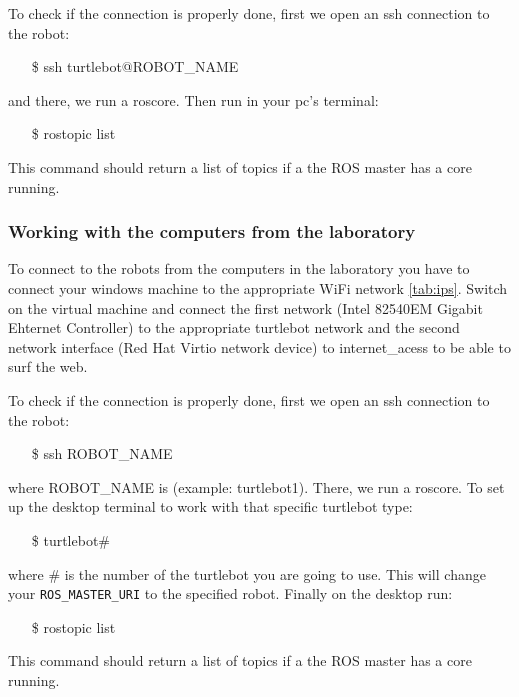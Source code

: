 \documentclass[a4paper,10pt]{article}
\begin{document}
To check if the connection is properly done, first we open an ssh connection to the robot:
\begin{shaded}
	\begin{itemize}
		\item[\$] ssh turtlebot@ROBOT\_NAME
	\end{itemize}
\end{shaded}
and there, we run a roscore. Then run in your pc's terminal:
\begin{shaded}
	\begin{itemize}
		\item[\$] rostopic list
	\end{itemize}
\end{shaded}
This command should return a list of topics if a the ROS master has a core running.

\subsubsection{Working with the computers from the laboratory}
To connect to the robots from the computers in the laboratory you have to connect your windows machine to the appropriate WiFi network \ref{tab:ips}. Switch on the virtual machine and connect the first network (Intel 82540EM Gigabit Ehternet Controller) to the appropriate turtlebot network and the second network interface (Red Hat Virtio network device) to internet_acess to be able to surf the web.

To check if the connection is properly done, first we open an ssh connection to the robot:
\begin{shaded}
	\begin{itemize}
		\item[\$] ssh ROBOT\_NAME
	\end{itemize}
\end{shaded}
where ROBOT\_NAME is  (example: turtlebot1). There, we run a roscore. To set up the desktop terminal to work with that specific turtlebot type:
\begin{shaded}
	\begin{itemize}
		\item[\$] turtlebot#
	\end{itemize}
\end{shaded}
where # is the number of the turtlebot you are going to use. This will change your \texttt{ROS\_MASTER\_URI} to the specified robot. Finally on the desktop run:
\begin{shaded}
	\begin{itemize}
		\item[\$] rostopic list
	\end{itemize}
\end{shaded}
This command should return a list of topics if a the ROS master has a core running.
\end{document}
